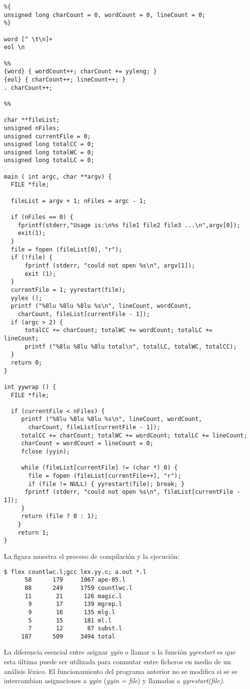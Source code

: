 \begin{verbatim}
%{
unsigned long charCount = 0, wordCount = 0, lineCount = 0;
%}

word [^ \t\n]+ 
eol \n 

%%
{word} { wordCount++; charCount += yyleng; }
{eol} { charCount++; lineCount++; }
. charCount++;

%%

char **fileList;
unsigned nFiles;
unsigned currentFile = 0;
unsigned long totalCC = 0;
unsigned long totalWC = 0;
unsigned long totalLC = 0;

main ( int argc, char **argv) {
  FILE *file;

  fileList = argv + 1; nFiles = argc - 1;

  if (nFiles == 0) {
    fprintf(stderr,"Usage is:\n%s file1 file2 file3 ...\n",argv[0]);
    exit(1);
  }
  file = fopen (fileList[0], "r");
  if (!file) {
      fprintf (stderr, "could not open %s\n", argv[1]);
      exit (1);
  }
  currentFile = 1; yyrestart(file);
  yylex ();
  printf ("%8lu %8lu %8lu %s\n", lineCount, wordCount,
    charCount, fileList[currentFile - 1]);
  if (argc > 2) {
      totalCC += charCount; totalWC += wordCount; totalLC += lineCount;
      printf ("%8lu %8lu %8lu total\n", totalLC, totalWC, totalCC);
  }
  return 0;
}

int yywrap () {
  FILE *file;

  if (currentFile < nFiles) {
     printf ("%8lu %8lu %8lu %s\n", lineCount, wordCount,
       charCount, fileList[currentFile - 1]);
     totalCC += charCount; totalWC += wordCount; totalLC += lineCount;
     charCount = wordCount = lineCount = 0;
     fclose (yyin);

     while (fileList[currentFile] != (char *) 0) {
       file = fopen (fileList[currentFile++], "r");
       if (file != NULL) { yyrestart(file); break; }
	  fprintf (stderr, "could not open %s\n", fileList[currentFile - 1]);
     }
     return (file ? 0 : 1);
    }
    return 1;
}
\end{verbatim}

La figura muestra el proceso de compilaci\'on y la ejecuci\'on:
\begin{verbatim}
$ flex countlwc.l;gcc lex.yy.c; a.out *.l
      58      179     1067 ape-05.l
      88      249     1759 countlwc.l
      11       21      126 magic.l
       9       17      139 mgrep.l
       9       16      135 mlg.l
       5       15      181 ml.l
       7       12       87 subst.l
     187      509     3494 total          
\end{verbatim}
La diferencia esencial entre asignar \emph{yyin} o llamar a la
funci\'on \emph{yyrestart} es que esta \'ultima puede ser utilizada para
conmutar entre ficheros en medio de un an\'alisis l\'exico. El
funcionamiento del programa anterior no se modifica si se 
se intercambian asignaciones a \emph{yyin} (\emph{yyin = file})
y llamadas a \emph{yyrestart(file)}.

